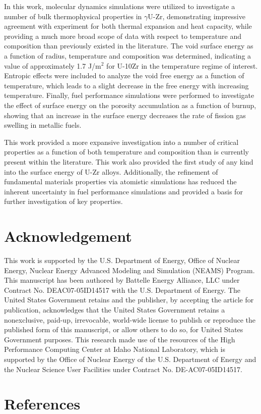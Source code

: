 \documentclass[review]{elsarticle}
\begin{document}
In this work, molecular dynamics simulations were utilized to investigate a number of bulk thermophysical properties in $\gamma$U-Zr, demonstrating impressive agreement with experiment for both thermal expansion and heat capacity, while providing a much more broad scope of data with respect to temperature and composition than previously existed in the literature. The void surface energy as a function of radius, temperature and composition was determined, indicating a value of approximately 1.7 J/m$^2$ for U-10Zr in the temperature regime of interest. Entropic effects were included to analyze the void free energy as a function of temperature, which leads to a slight decrease in the free energy with increasing temperature. Finally, fuel performance simulations were performed to investigate the effect of surface energy on the porosity accumulation as a function of burnup, showing that an increase in the surface energy decreases the rate of fission gas swelling in metallic fuels. 

This work provided a more expansive investigation into a number of critical properties as a function of both temperature and composition than is currently present within the literature. This work also provided the first study of any kind into the surface energy of U-Zr alloys. Additionally, the refinement of fundamental materials properties via atomistic simulations has reduced the inherent uncertainty in fuel performance simulations and provided a basis for further investigation of key properties.


\section{Acknowledgement}
This work is supported by the U.S. Department of Energy, Office of Nuclear Energy, Nuclear Energy Advanced Modeling and Simulation (NEAMS) Program. This manuscript has been authored by Battelle Energy Alliance, LLC under Contract No. DEAC07-05ID14517 with the U.S. Department of Energy. The United States Government retains and the publisher, by accepting the article for publication, acknowledges that the United States Government retains a nonexclusive, paid-up, irrevocable, world-wide license to publish or reproduce the published form of this manuscript, or allow others to do so, for United States Government purposes. This research made use of the resources of the High Performance Computing Center at Idaho National Laboratory, which is supported by the Office of Nuclear Energy of the U.S. Department of Energy and the Nuclear Science User Facilities under Contract No. DE-AC07-05ID14517.



\section{References}


\end{document}
